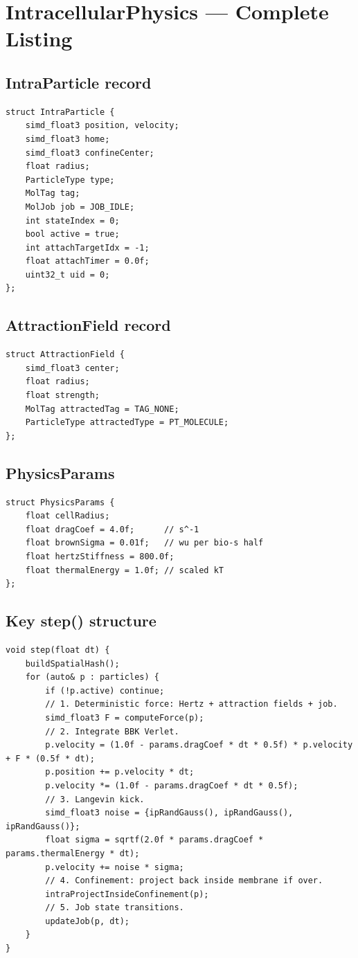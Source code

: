 \documentclass[11pt,letterpaper,twoside,openany]{book}
\begin{document}
\chapter{IntracellularPhysics --- Complete Listing}
\label{ch:intraphysics-full}

\section{IntraParticle record}

\begin{lstlisting}
struct IntraParticle {
    simd_float3 position, velocity;
    simd_float3 home;
    simd_float3 confineCenter;
    float radius;
    ParticleType type;
    MolTag tag;
    MolJob job = JOB_IDLE;
    int stateIndex = 0;
    bool active = true;
    int attachTargetIdx = -1;
    float attachTimer = 0.0f;
    uint32_t uid = 0;
};
\end{lstlisting}

\section{AttractionField record}

\begin{lstlisting}
struct AttractionField {
    simd_float3 center;
    float radius;
    float strength;
    MolTag attractedTag = TAG_NONE;
    ParticleType attractedType = PT_MOLECULE;
};
\end{lstlisting}

\section{PhysicsParams}

\begin{lstlisting}
struct PhysicsParams {
    float cellRadius;
    float dragCoef = 4.0f;      // s^-1
    float brownSigma = 0.01f;   // wu per bio-s half
    float hertzStiffness = 800.0f;
    float thermalEnergy = 1.0f; // scaled kT
};
\end{lstlisting}

\section{Key step() structure}

\begin{lstlisting}
void step(float dt) {
    buildSpatialHash();
    for (auto& p : particles) {
        if (!p.active) continue;
        // 1. Deterministic force: Hertz + attraction fields + job.
        simd_float3 F = computeForce(p);
        // 2. Integrate BBK Verlet.
        p.velocity = (1.0f - params.dragCoef * dt * 0.5f) * p.velocity + F * (0.5f * dt);
        p.position += p.velocity * dt;
        p.velocity *= (1.0f - params.dragCoef * dt * 0.5f);
        // 3. Langevin kick.
        simd_float3 noise = {ipRandGauss(), ipRandGauss(), ipRandGauss()};
        float sigma = sqrtf(2.0f * params.dragCoef * params.thermalEnergy * dt);
        p.velocity += noise * sigma;
        // 4. Confinement: project back inside membrane if over.
        intraProjectInsideConfinement(p);
        // 5. Job state transitions.
        updateJob(p, dt);
    }
}
\end{lstlisting}
\end{document}
